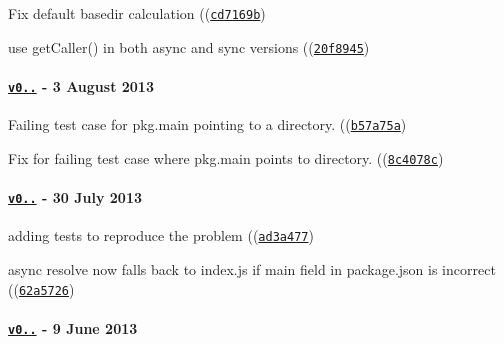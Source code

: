 \begin{DoxyItemize}
\item Fix default basedir calculation ((\href{https://github.com/browserify/resolve/commit/cd7169b204b9f474b6a924adf47564f33a469f07}{\tt {\ttfamily cd7169b}})
\item use get\+Caller() in both async and sync versions ((\href{https://github.com/browserify/resolve/commit/20f89456f7fc1d8e51b95ec1ab38b1ac154d9fc4}{\tt {\ttfamily 20f8945}})
\end{DoxyItemize}

\paragraph*{\href{https://github.com/browserify/resolve/compare/v0.4.1...v0.4.2}{\tt v0..} -\/ 3 August 2013}


\begin{DoxyItemize}
\item Failing test case for pkg.\+main pointing to a directory. ((\href{https://github.com/browserify/resolve/commit/b57a75aefc394ead20d54ed107741f1f7151b90f}{\tt {\ttfamily b57a75a}})
\item Fix for failing test case where pkg.\+main points to directory. ((\href{https://github.com/browserify/resolve/commit/8c4078c9dd45c6a92f1f409d70aaccc95be3bfc6}{\tt {\ttfamily 8c4078c}})
\end{DoxyItemize}

\paragraph*{\href{https://github.com/browserify/resolve/compare/v0.4.0...v0.4.1}{\tt v0..} -\/ 30 July 2013}


\begin{DoxyItemize}
\item adding tests to reproduce the problem ((\href{https://github.com/browserify/resolve/commit/ad3a4772ddd7187ff38cb56e00635b37a491e1fa}{\tt {\ttfamily ad3a477}})
\item async resolve now falls back to \textquotesingle{}index.\+js\textquotesingle{} if main field in package.\+json is incorrect ((\href{https://github.com/browserify/resolve/commit/62a572635f21bf1c28360ea5c2238be62736429b}{\tt {\ttfamily 62a5726}})
\end{DoxyItemize}

\paragraph*{\href{https://github.com/browserify/resolve/compare/v0.3.1...v0.4.0}{\tt v0..} -\/ 9 June 2013}


